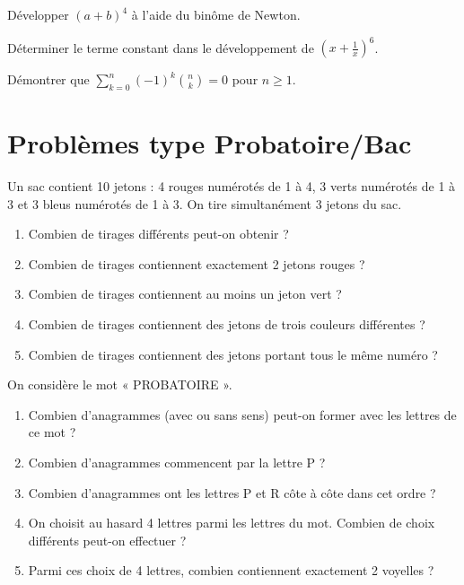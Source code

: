 
\exo{}
Développer $(a+b)^4$ à l'aide du binôme de Newton.

\exo{}
Déterminer le terme constant dans le développement de $\left(x + \frac{1}{x}\right)^6$.

\exo{}
Démontrer que $\sum_{k=0}^{n} (-1)^k \binom{n}{k} = 0$ pour $n \ge 1$.

\section{Problèmes type Probatoire/Bac}

Un sac contient 10 jetons : 4 rouges numérotés de 1 à 4, 3 verts numérotés de 1 à 3 et 3 bleus numérotés de 1 à 3. On tire simultanément 3 jetons du sac.
\begin{enumerate}[label=\arabic*)]
    \item Combien de tirages différents peut-on obtenir ?
    \item Combien de tirages contiennent exactement 2 jetons rouges ?
    \item Combien de tirages contiennent au moins un jeton vert ?
    \item Combien de tirages contiennent des jetons de trois couleurs différentes ?
    \item Combien de tirages contiennent des jetons portant tous le même numéro ?
\end{enumerate}

On considère le mot « PROBATOIRE ».
\begin{enumerate}[label=\arabic*)]
    \item Combien d'anagrammes (avec ou sans sens) peut-on former avec les lettres de ce mot ?
    \item Combien d'anagrammes commencent par la lettre P ?
    \item Combien d'anagrammes ont les lettres P et R côte à côte dans cet ordre ?
    \item On choisit au hasard 4 lettres parmi les lettres du mot. Combien de choix différents peut-on effectuer ?
    \item Parmi ces choix de 4 lettres, combien contiennent exactement 2 voyelles ?
\end{enumerate}

